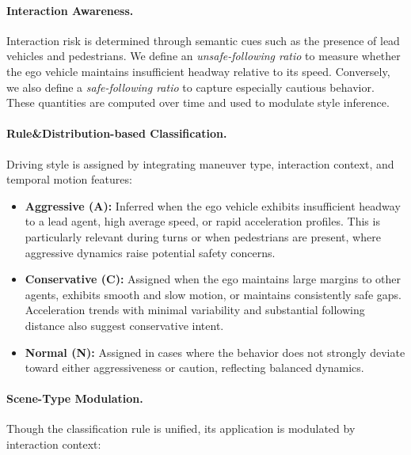 \documentclass{article}
\begin{document}
\paragraph{Interaction Awareness.}
Interaction risk is determined through semantic cues such as the presence of lead vehicles and pedestrians. We define an \textit{unsafe-following ratio} to measure whether the ego vehicle maintains insufficient headway relative to its speed. Conversely, we also define a \textit{safe-following ratio} to capture especially cautious behavior. These quantities are computed over time and used to modulate style inference.

\paragraph{Rule\&Distribution-based Classification.}
Driving style is assigned by integrating maneuver type, interaction context, and temporal motion features:

\begin{itemize}[leftmargin=1em, topsep=0pt, itemsep=0.3em]
    \item \textbf{Aggressive (A):} Inferred when the ego vehicle exhibits insufficient headway to a lead agent, high average speed, or rapid acceleration profiles. This is particularly relevant during turns or when pedestrians are present, where aggressive dynamics raise potential safety concerns.
    
    \item \textbf{Conservative (C):} Assigned when the ego maintains large margins to other agents, exhibits smooth and slow motion, or maintains consistently safe gaps. Acceleration trends with minimal variability and substantial following distance also suggest conservative intent.
    
    \item \textbf{Normal (N):} Assigned in cases where the behavior does not strongly deviate toward either aggressiveness or caution, reflecting balanced dynamics.
\end{itemize}

\paragraph{Scene-Type Modulation.}
Though the classification rule is unified, its application is modulated by interaction context:
\end{document}
